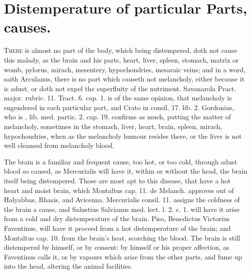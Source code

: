 {%
\section{Distemperature of particular Parts, causes.}

\lettrine{T}{here} is almost no part of the body, which being distempered, doth not
cause this malady, as the brain and his parts, heart, liver, spleen,
stomach, matrix or womb, pylorus, mirach, mesentery, hypochondries,
mesaraic veins; and in a word, saith Arculanus, there is no part
which causeth not melancholy, either because it is adust, or doth not
expel the superfluity of the nutriment. Savanarola Pract. major.
rubric. 11. Tract. 6. cap. 1. is of the same opinion, that melancholy
is engendered in each particular part, and Crato in \textlatin{consil. 17.
lib. 2.} Gordonius, who is , \textlatin{lib. med. partic. 2. cap. 19.}
confirms as much, putting the matter of melancholy, sometimes in
the stomach, liver, heart, brain, spleen, mirach, hypochondries, when
as the melancholy humour resides there, or the liver is not well
cleansed from melancholy blood.

The brain is a familiar and frequent cause, too hot, or too cold,
 through adust blood so caused, as Mercurialis will have it,
within or without the head, the brain itself being distempered. Those
are most apt to this disease, that have a hot heart and moist
brain, which Montaltus cap. 11. de Melanch. approves out of Halyabbas,
Rhasis, and Avicenna. \textlatin{Mercurialis consil. 11.} assigns the coldness of
the brain a cause, and Salustius Salvianus \textlatin{med. lect. l. 2. c. 1.}
will have it arise from a cold and dry distemperature of the
brain. Piso, Benedictus Victorius Faventinus, will have it proceed from
a hot distemperature of the brain; and Montaltus cap. 10.
from the brain's heat, scorching the blood. The brain is still
distempered by himself, or by consent: by himself or his proper
affection, as Faventinus calls it, or by vapours which arise from
the other parts, and fume up into the head, altering the animal
facilities.

}
